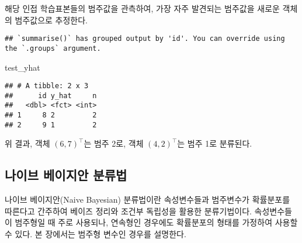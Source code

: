 \documentclass[
]{book}
\newenvironment{Shaded}{\begin{snugshade}}{\end{snugshade}}
\newcommand{\AttributeTok}[1]{\textcolor[rgb]{0.77,0.63,0.00}{#1}}
\newcommand{\DecValTok}[1]{\textcolor[rgb]{0.00,0.00,0.81}{#1}}
\newcommand{\FunctionTok}[1]{\textcolor[rgb]{0.00,0.00,0.00}{#1}}
\newcommand{\NormalTok}[1]{#1}
\newcommand{\OtherTok}[1]{\textcolor[rgb]{0.56,0.35,0.01}{#1}}
\newcommand{\SpecialCharTok}[1]{\textcolor[rgb]{0.00,0.00,0.00}{#1}}
\begin{document}
해당 인접 학습표본들의 범주값을 관측하여, 가장 자주 발견되는 범주값을 새로운 객체의 범주값으로 추정한다.

\begin{Shaded}
\end{Shaded}

\begin{verbatim}
## `summarise()` has grouped output by 'id'. You can override using the `.groups` argument.
\end{verbatim}

\begin{Shaded}
\begin{Highlighting}[]
\NormalTok{test\_yhat}
\end{Highlighting}
\end{Shaded}

\begin{verbatim}
## # A tibble: 2 x 3
##      id y_hat     n
##   <dbl> <fct> <int>
## 1     8 2         2
## 2     9 1         2
\end{verbatim}

위 결과, 객체 \((6, 7)^\top\)는 범주 2로, 객체 \((4, 2)^\top\)는 범주 1로 분류된다.

\hypertarget{naive-bayes}{%
\subsection{나이브 베이지안 분류법}\label{naive-bayes}}

나이브 베이지안(Naive Bayesian) 분류법이란 속성변수들과 범주변수가 확률분포를 따른다고 간주하여 베이즈 정리와 조건부 독립성을 활용한 분류기법이다. 속성변수들이 범주형일 때 주로 사용되나, 연속형인 경우에도 확률분포의 형태를 가정하여 사용할 수 있다. 본 장에서는 범주형 변수인 경우를 설명한다.
\end{document}
